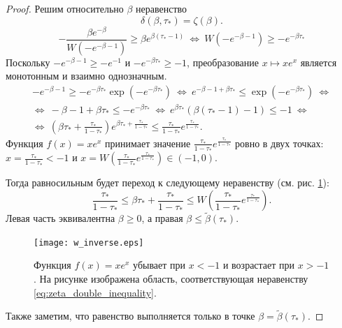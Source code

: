 \begin{proof}
	Решим относительно $\beta$ неравенство 
	\[
	\delta(\beta, \tau_*) = \zeta(\beta).
	\]
	\[
	-\dfrac{\beta e^{-\beta}}{W(-e^{-\beta - 1})} \geqslant \beta e^{\beta(\tau_* - 1)}\ \Leftrightarrow\ W(-e^{-\beta - 1}) \geqslant -e^{-\beta\tau_*}
	\]
	Поскольку $-e^{-\beta - 1} \geqslant -e^{-1}$ и $-e^{-\beta\tau_*} \geqslant -1$, преобразование $x \mapsto x e^x$ является монотонным и взаимно однозначным.
	\begin{multline*}
		-e^{-\beta - 1} \geqslant -e^{-\beta\tau_*}\exp(-e^{-\beta\tau_*})\ \Leftrightarrow\ e^{-\beta - 1 + \beta\tau_*} \leqslant \exp(-e^{-\beta\tau_*})\ \Leftrightarrow
		\\
		\Leftrightarrow\ -\beta - 1 + \beta\tau_* \leqslant -e^{-\beta \tau_*}\ \Leftrightarrow \ e^{\beta \tau_*}(\beta(\tau_* - 1) - 1) \leqslant -1\ \Leftrightarrow
		\\
		\Leftrightarrow\ \left(\beta \tau_* + \frac{\tau_*}{1 - \tau_*}\right) e^{\beta \tau_* + \frac{\tau_*}{1 - \tau_*}} \leqslant \frac{\tau_*}{1 - \tau_*} e^{\frac{\tau_*}{1 - \tau_*}}.
	\end{multline*}
	Функция $f(x) = x e^x$ принимает значение $\frac{\tau_*}{1 - \tau_*} e^{\frac{\tau_*}{1 - \tau_*}}$ ровно в двух точках: $x = \frac{\tau_*}{1 - \tau_*} < -1$ и $x = W\left(\frac{\tau_*}{1 - \tau_*} e^{\frac{\tau_*}{1 - \tau_*}}\right) \in (-1, 0)$.
	
	Тогда равносильным будет переход к следующему неравенству (см. рис. \ref{fig:w_inverse}):
	\begin{equation}
		\label{eq:zeta_double_inequality}
		\frac{\tau_*}{1 - \tau_*} \leqslant \beta \tau_* + \frac{\tau_*}{1 - \tau_*} \leqslant  W\left(\frac{\tau_*}{1 - \tau_*} e^{\frac{\tau_*}{1 - \tau_*}}\right).
	\end{equation}
	Левая часть эквивалентна $\beta \geqslant 0$, а правая $\beta \leqslant \tilde{\beta}(\tau_*)$.
	\begin{figure}[ht]
		\centering
		\texttt{[image: w\_inverse.eps]}
		\caption{Функция $f(x) = x e^x$ убывает при $x < -1$ и возрастает при $x > -1$. На рисунке изображена область, соответствующая неравенству \eqref{eq:zeta_double_inequality}.}
		\label{fig:w_inverse}
	\end{figure}
	
	Также заметим, что равенство выполняется только в точке $\beta = \tilde{\beta}(\tau_*)$.
	
\end{proof}

